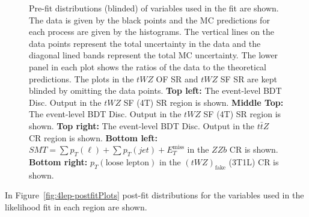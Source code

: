 \begin{figure}[htbp]
        \caption{Pre-fit distributions (blinded) of variables used in the fit are shown. The data is given by the black points and the MC predictions for each process are given by the histograms. The vertical lines on the data points represent the total uncertainty in the data and the diagonal lined bands represent the total MC uncertainty. The lower panel in each plot shows the ratios of the data to the theoretical predictions. The plots in the $tWZ$ OF SR and $tWZ$ SF SR are kept blinded by omitting the data points. \textbf{Top left:} The event-level BDT Disc. Output in the $tWZ$ SF (4T) SR region is shown. \textbf{Middle Top:} The event-level BDT Disc. Output in the $tWZ$ SF (4T) SR region is shown. \textbf{Top right:} The event-level BDT Disc. Output in the $t\bar{t}Z$ CR region is shown. \textbf{Bottom left:} $SMT = \sum p_{T} (\ell) + \sum p_{T} (jet) + E_{T}^{\text{miss}}$ in the $ZZb$ CR is shown. \textbf{Bottom right:} $p_{T}(\text{loose lepton})$ in the $(tWZ)_{\text{fake}}$ (3T1L) CR is shown.}
  \label{fig:4lep-prefitPlots}
\end{figure}


In Figure~\ref{fig:4lep-postfitPlots} post-fit distributions for the variables used in the likelihood fit in each region are shown.

